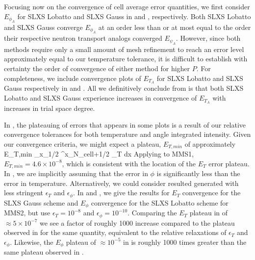 Focusing now on the convergence of cell average error quantities, we first consider $E_{\phi_A}$ for SLXS Lobatto and SLXS Gauss in  and , respectively.
Both SLXS Lobatto and SLXS Gauss converge $E_{\phi_A}$ at an order less than or at most equal to the order their respective neutron transport analogs converged $E_{\psi_A}$.
However, since both methods require only a small amount of mesh refinement to reach an error level approximately equal to our temperature tolerance, it is difficult to establish with certainty the order of convergence of either method for higher $P$.
For completeness, we include convergence plots of $E_{T_A}$ for SLXS Lobatto and SLXS Gauss respectively in  and .
All we definitively conclude from  is that both SLXS Lobatto and SLXS Gauss experience increases in convergence of $E_{T_A}$ with increases in trial space degree.

In , the plateauing of errors that appears in some plots is a result of our relative convergence tolerances for both temperature and angle integrated intensity. 
Given our convergence criteria, we might expect a plateau, $E_{T,min}$ of approximately
\benum
E_{T,min} \int_{x_{1/2} }^{x_{N_{cell}+1/2}}{ \epsilon_T  dx} \pep
\label{eq:err_plateau}
\eenum
Applying  to MMS1, $E_{T,min} = 4.6\times 10^{-8}$, which is consistent with the location of the $E_T$ error plateau.
In , we are implicitly assuming that the error in $\phi$ is significantly less than the error in temperature. 
Alternatively, we could consider resulted generated with less stringent $\epsilon_T$ and $\epsilon_{\phi}$.
In  and , we give the results for $E_{T}$ convergence for the SLXS Gauss scheme and $E_{\phi}$ convergence for the SLXS Lobatto scheme for MMS2, but use $\epsilon_T=10^{-8}$ and $\epsilon_{\phi} = 10^{-10}$.  
Comparing the $E_T$ plateau in  of $\approx 5 \times 10^{-7}$ we see a factor of roughly 1000 increase compared to the plateau observed in 
 for the same quantity, equivalent to the relative relaxations of $\epsilon_T$ and $\epsilon_{\phi}$.
Likewise, the $E_{\phi}$ plateau of $\approx 10^{-5}$ in  is roughly 1000 times greater than the same plateau observed in .

